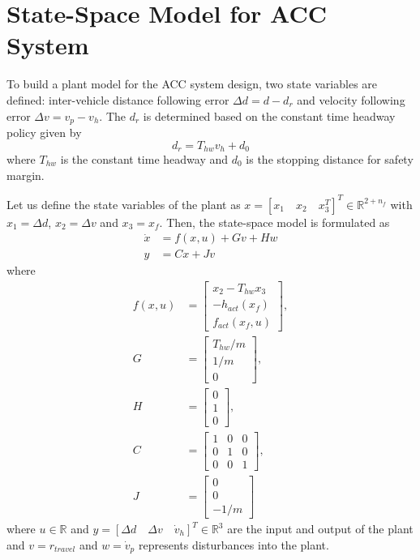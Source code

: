 \documentclass[12pt]{report}
\begin{document}
\section{State-Space Model for ACC System}
To build a plant model for the ACC system design, two state variables are defined: inter-vehicle distance following error \(\Delta d = d - d_r\) and velocity following error \(\Delta v = v_p - v_h\). The \(d_r\) is determined based on the constant time headway policy given by
\begin{equation}
    d_r = T_{hw}v_h + d_0
\end{equation}
where \(T_{hw}\) is the constant time headway and \(d_0\) is the stopping distance for safety margin.

Let us define the state variables of the plant as \(x = [x_1 \quad x_2 \quad x_3^T]^T \in \mathbb{R}^{2+n_f}\) with \(x_1 = \Delta d\), \(x_2 = \Delta v\) and \(x_3 = x_f\). Then, the state-space model is formulated as
\begin{align}
    \dot{x} & = f(x, u) + Gv + Hw \\
    y       & = Cx + Jv
\end{align}
where
\begin{align*}
    f(x, u) & = \begin{bmatrix}
                    x_2 - T_{hw}x_3 \\
                    -h_{act}(x_f)   \\
                    f_{act}(x_f, u)
                \end{bmatrix}, \\
    G       & = \begin{bmatrix}
                    T_{hw}/m \\
                    1/m      \\
                    0
                \end{bmatrix},           \\
    H       & = \begin{bmatrix}
                    0 \\
                    1 \\
                    0
                \end{bmatrix},           \\
    C       & = \begin{bmatrix}
                    1 & 0 & 0 \\
                    0 & 1 & 0 \\
                    0 & 0 & 1
                \end{bmatrix},           \\
    J       & = \begin{bmatrix}
                    0 \\
                    0 \\
                    -1/m
                \end{bmatrix}
\end{align*}
where \(u \in \mathbb{R}\) and \(y = [\Delta d \quad \Delta v \quad \dot{v}_h]^T \in \mathbb{R}^3\) are the input and output of the plant and \(v = r_{travel}\) and \(w = \dot{v}_p\) represents disturbances into the plant.
\end{document}
